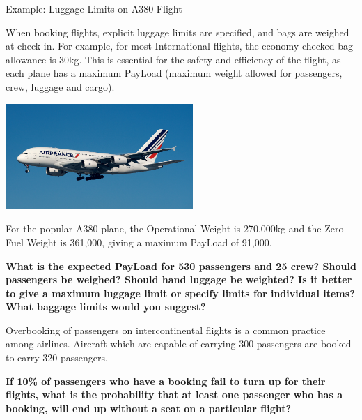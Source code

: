 \documentclass[t,xcolor=pdftex,dvipsnames,table]{beamer}\usepackage[]{graphicx}\usepackage[]{color}
\begin{document}
\begin{frame}[fragile]{Example: Luggage Limits on A380 Flight}

When booking flights, explicit luggage limits are specified, and bags are weighed at check-in. For example, for most International flights, the economy checked bag allowance is 30kg. This is essential for the safety and efficiency of the flight, as each plane has a maximum PayLoad (maximum weight allowed for passengers, crew, luggage and cargo).
\href{http://www.qantas.com/travel/airlines/checked-baggage/global/en#international-flights-excluding-north-and-south-america}{}

\begin{center}
\includegraphics[height=4cm]{../images/A380.jpg}
\end{center}
\end{frame}



\begin{frame}{}

For the popular A380 plane, the Operational Weight is 270,000kg and the Zero Fuel Weight is 361,000, giving a maximum PayLoad of 91,000.
\href{hthttps://en.wikipedia.org/wiki/Airbus_A380}{}
\href{http://aviation.stackexchange.com/questions/1008/what-is-the-weight-budget-of-a-fully-loaded-a380}{}

\vspace{.5cm}
{\bf What is the expected PayLoad for 530 passengers and 25 crew? Should passengers be weighed? Should hand luggage be weighted? Is it better to give a maximum luggage limit or specify limits for individual items? What baggage limits would you suggest?}

\vspace{.5cm}
Overbooking of passengers on intercontinental flights is a common practice among airlines. Aircraft which are capable of carrying 300 passengers are booked to carry 320 passengers. 

\vspace{.5cm}
{\bf If 10\% of passengers who have a booking fail
to turn up for their flights, what is the probability that at least one passenger
who has a booking, will end up without a seat on a particular flight?}

\end{frame}
\end{document}
